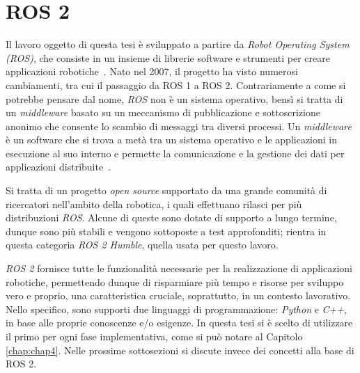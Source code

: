 \section{ROS 2}
Il lavoro oggetto di questa tesi è sviluppato a partire da \textit{Robot Operating System (ROS)}, che consiste in un insieme di librerie software e strumenti
per creare applicazioni robotiche~\cite{doi:10.1126/scirobotics.abm6074}. 
Nato nel 2007, il progetto ha visto numerosi cambiamenti, tra cui il passaggio da
ROS 1 a ROS 2.
Contrariamente a come si potrebbe pensare dal nome, \textit{ROS} non è un sistema 
operativo, bensì si tratta di un \textit{middleware} basato su un meccanismo 
di pubblicazione e sottoscrizione anonimo che consente lo scambio di 
messaggi tra diversi processi.
Un \textit{middleware} è un software che si trova a metà tra un sistema operativo e le
applicazioni in esecuzione al suo interno e permette la comunicazione e la gestione
dei dati per applicazioni distribuite~\cite{middleware}.

Si tratta di un progetto \textit{open source} supportato da una grande comunità di
ricercatori nell'ambito della robotica, i quali effettuano rilasci per più distribuzioni \textit{ROS}. 
Alcune di queste sono dotate di supporto a lungo termine, dunque sono più stabili 
e vengono sottoposte a test approfonditi; rientra in questa categoria \textit{ROS 2 Humble}, 
quella usata per questo lavoro.

\textit{ROS 2} fornisce tutte le funzionalità necessarie per la realizzazione di applicazioni robotiche, 
permettendo dunque di risparmiare più tempo e risorse per sviluppo vero e proprio, una 
caratteristica cruciale, soprattutto, in un contesto lavorativo.
Nello specifico, sono supporti due linguaggi di programmazione: \textit{Python} e \textit{C++}, in base alle proprie conoscenze e/o esigenze.
In questa tesi si è scelto di utilizzare il primo per ogni fase implementativa, come si può
notare al Capitolo \ref{chap:chap4}. Nelle prossime sottosezioni si discute invece 
dei concetti alla base di ROS 2.

